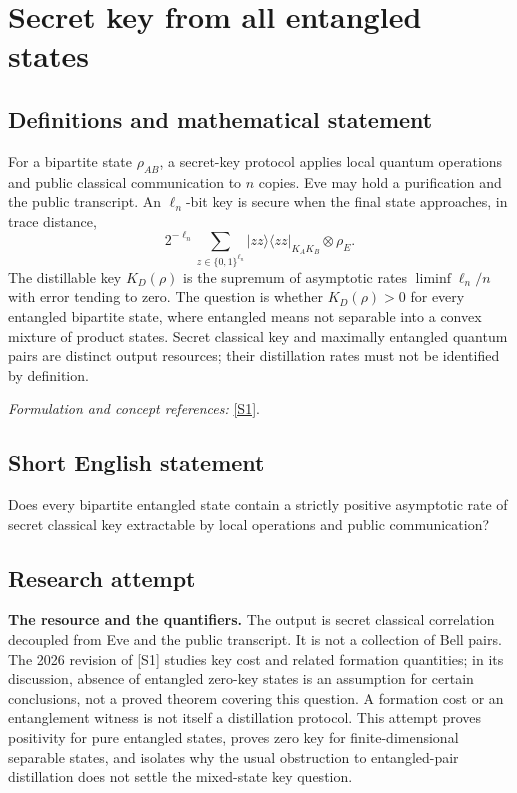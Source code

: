 \documentclass[11pt]{article}
\begin{document}
\section*{\texorpdfstring{Secret key from all entangled states}{Secret key from all entangled states}}\label{30006845}
\subsection{Definitions and mathematical statement}
For a bipartite state $\rho_{AB}$, a secret-key protocol applies local quantum operations and public classical communication to $n$ copies. Eve may hold a purification and the public transcript. An $\ell_n$-bit key is secure when the final state approaches, in trace distance,
\[
 2^{-\ell_n}\sum_{z\in\{0,1\}^{\ell_n}}|zz\rangle\langle zz|_{K_AK_B}\otimes\rho_E.
\]
The distillable key $K_D(\rho)$ is the supremum of asymptotic rates $\liminf\ell_n/n$ with error tending to zero. The question is whether $K_D(\rho)>0$ for every entangled bipartite state, where entangled means not separable into a convex mixture of product states. Secret classical key and maximally entangled quantum pairs are distinct output resources; their distillation rates must not be identified by definition.
\par\smallskip\textit{Formulation and concept references:} \href{https://arxiv.org/html/2402.17007}{[S1]}.

\subsection{Short English statement}
Does every bipartite entangled state contain a strictly positive asymptotic rate of secret classical key extractable by local operations and public communication?
\subsection{Research attempt}
\textbf{The resource and the quantifiers.}
The output is secret classical correlation decoupled from Eve and the public
transcript.  It is not a collection of Bell pairs.  The 2026 revision of [S1]
studies key cost and related formation quantities; in its discussion, absence
of entangled zero-key states is an assumption for certain conclusions, not a
proved theorem covering this question.  A formation cost or an entanglement
witness is not itself a distillation protocol.  This attempt proves positivity
for pure entangled states, proves zero key for finite-dimensional separable
states, and isolates why the usual obstruction to entangled-pair distillation
does not settle the mixed-state key question.
\end{document}
